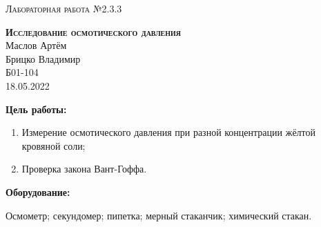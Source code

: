 \documentclass[14pt,a4paper]{extreport}
\begin{document}
	
	\begin{center}
		\large
		\textsc{Лабораторная работа №2.3.3}
		
		\LARGE
		\textbf{\textsc{Исследование осмотического давления}}
		\\[5mm]
		
		\large
		Маслов Артём\\
		Брицко Владимир\\
		Б01-104
		\\[3mm]
		18.05.2022
	\end{center}
	
	\textbf{\large Цель работы:}
	
	\begin{enumerate}
		\item Измерение осмотического давления при разной концентрации жёлтой кровяной соли;
		\item Проверка закона Вант-Гоффа.
	\end{enumerate}
	
	\textbf{\large Оборудование:}
	
	Осмометр; секундомер; пипетка; мерный стаканчик; химический стакан.
	
	
	
	
	
	
	
	
	
\end{document}
